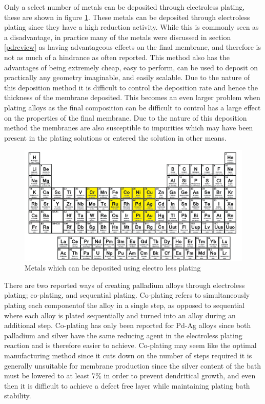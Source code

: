 Only a select number of metals can be deposited through electroless plating, these are shown in figure \ref{fig:elpmetals}. \cite{Exter2015} These metals can be deposited through electroless plating since they have a high reduction activity. While this is commonly seen as a disadvantage, in practice many of the metals were discussed in section \ref{pdreview} as having advantageous effects on the final membrane, and therefore is not as much of a hindrance as often reported. \cite{Exter2015} This method also has the advantages of being extremely cheap, easy to perform, can be used to deposit on practically any geometry imaginable, and easily scalable. Due to the nature of this deposition method it is difficult to control the deposition rate and hence the thickness of the membrane deposited. This becomes an even larger problem when plating alloys as the final composition can be difficult to control has a large effect on the properties of the final membrane. Due to the nature of this deposition method the membranes are also susceptible to impurities which may have been present in the plating solutions or entered the solution in other means. 

\begin{figure}[H]
    \centering
    \includegraphics{figures/elpmetals.png}
    \caption{Metals which can be deposited using electro less plating  \cite{Exter2015}}
    \label{fig:elpmetals}
\end{figure}

There are two reported ways of creating palladium alloys through electroless plating; co-plating, and sequential plating. Co-plating refers to simultaneously plating each componentof the alloy in a single step, as opposed to sequential where each alloy is plated sequentially and turned into an alloy during an additional step. Co-plating has only been reported for Pd-Ag alloys since both palladium and silver have the same reducing agent in the electroless plating reaction and is therefore easier to achieve.\cite{Kikuchi1991, UEMIYA1991303} Co-plating may seem like the optimal manufacturing method since it cuts down on the number of steps required it is generally unsuitable for membrane production since the silver content of the bath must be lowered to at least 7\% in order to prevent dendritical growth, and even then it is difficult to achieve a defect free layer while maintaining plating bath stability. \cite{Exter2015}

